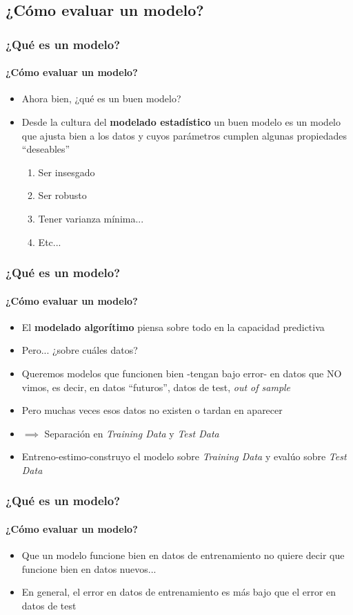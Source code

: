 \documentclass{beamer}
\begin{document}
\subsection{¿Cómo evaluar un modelo?}
\begin{frame}
	\frametitle{¿Qué es un modelo?}
	\framesubtitle{¿Cómo evaluar un modelo?}
	\begin{itemize}
		\item{Ahora bien, ¿qué es un buen modelo?}
		\item{Desde la cultura del \textbf{modelado estadístico} un buen modelo es un modelo que ajusta bien a los datos y cuyos parámetros cumplen algunas propiedades ``deseables''}
		\begin{enumerate}
			\item Ser insesgado
			\item Ser robusto 
			\item Tener varianza mínima...
			\item Etc...			
		\end{enumerate}
	\end{itemize}
\end{frame}

\begin{frame}
	\frametitle{¿Qué es un modelo?}
	\framesubtitle{¿Cómo evaluar un modelo?}
	\begin{itemize}
		\item{El \textbf{modelado algorítimo} piensa sobre todo en la capacidad predictiva}
		\item{Pero... ¿sobre cuáles datos?}
		\item{Queremos modelos que funcionen bien -tengan bajo error- en datos que NO vimos, es decir, en datos ``futuros'', datos de test, \emph{out of sample}}
		\item{Pero muchas veces esos datos no existen o tardan en aparecer}
		\item{$\implies$ Separación en \emph{Training Data} y \emph{Test Data}}
		\item{Entreno-estimo-construyo el modelo sobre \emph{Training Data} y evalúo sobre \emph{Test Data}}
	\end{itemize}
\end{frame}


\begin{frame}
	\frametitle{¿Qué es un modelo?}
	\framesubtitle{¿Cómo evaluar un modelo?}
	\begin{itemize}
		\item{Que un modelo funcione bien en datos de entrenamiento no quiere decir que funcione bien en datos nuevos...}
		\item{En general, el error en datos de entrenamiento es más bajo que el error en datos de test}
	\end{itemize}
\end{frame}
\end{document}
